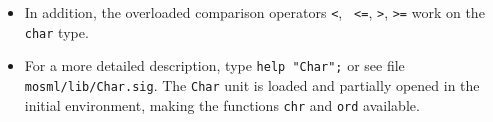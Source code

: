 \documentclass[fleqn]{article}
\begin{document}
\begin{itemize}
\item In addition, the overloaded comparison operators {\tt <}, {\tt
    <=}, {\tt >}, {\tt >=} work on the {\tt char} type.

\item For a more detailed description, type {\tt help "Char";} or see
  file {\tt mosml/lib/Char.sig}.  The {\tt Char} unit is loaded and
  partially opened in the initial environment, making the functions
  {\tt chr} and {\tt ord} available.
\end{itemize}

%
%
%
% 
%
%
%
\end{document}
